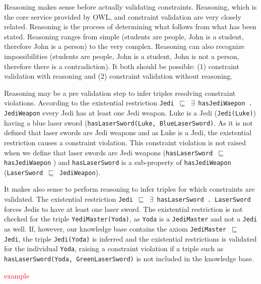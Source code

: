 \documentclass{llncs}
\newcommand{\ms}[1]{\texttt{#1}}
\begin{document}

Reasoning makes sense before actually validating constraints.
Reasoning, which is the core service provided by OWL,
and constraint validation are very closely related. 
Reasoning is the process of determining what follows from what has been
stated.  Reasoning ranges from simple (students are people, John is a
student, therefore John is a person) to the very complex. Reasoning can
also recognize impossibilities (students are people, John is a student, John
is not a person, therefore there is a contradiction). 
It both should be possible: (1) constraint validation with reasoning and (2) constraint validation without reasoning. 

Reasoning may be a pre validation step to infer triples resolving constraint violations.
According to the existential restriction \ms{Jedi $\sqsubseteq$ $\exists$ hasJediWaepon . JediWeapon} every Jedi has at least one Jedi weapon.
Luke is a Jedi (\ms{Jedi(Luke)}) having a blue laser sword (\ms{hasLaserSword(Luke, BlueLaserSword)}.
As it is not defined that laser swords are Jedi weapons and as Luke is a Jedi, the existential restriction causes a constraint violation. 
This constraint violation is not raised when we define that laser swords are Jedi weapons (\ms{hasLaserSword $\sqsubseteq$ hasJediWaepon} ) 
and \ms{hasLaserSword} is a sub-property of \ms{hasJediWeapon} (\ms{LaserSword $\sqsubseteq$ JediWeapon}).

It makes also sense to perform reasoning to infer triples for which constraints are validated.
The existential restriction \ms{Jedi $\sqsubseteq$ $\exists$ hasLaserSword . LaserSword} forces Jedis to have at least one laser sword.
The existential restriction is not checked for the triple \ms{YediMaster(Yoda)}, as \ms{Yoda} is a \ms{JediMaster} and not a \ms{Jedi} as well.
If, however, our knowledge base contains the axiom \ms{JediMaster $\sqsubseteq$ Jedi}, the triple \ms{Jedi(Yoda)} is inferred and the existential restrictions is validated for the individual \ms{Yoda}, raising a constraint violation if a triple such as \ms{hasLaserSword(Yoda, GreenLaserSword)} is not included in the knowledge base. 

\textcolor{red}{example}
\end{document}
